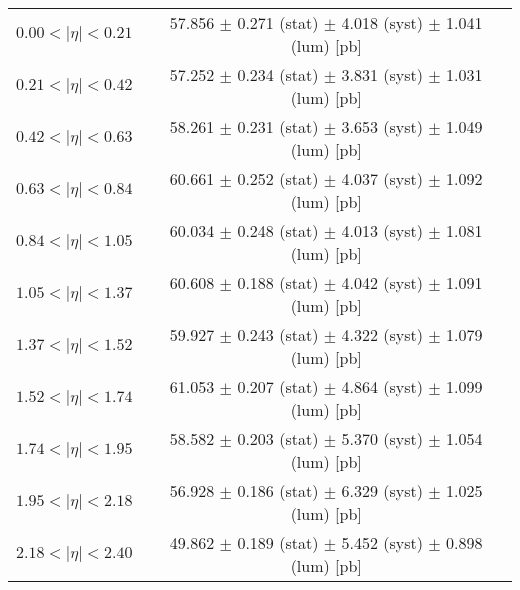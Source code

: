 \begin{tabular}{lc}
\hline
$0.00 < |\eta| <0.21$          & 57.856 $\pm$ 0.271 (stat) $\pm$ 4.018 (syst) $\pm$ 1.041 (lum) [pb]  \\
$0.21 < |\eta| <0.42$          & 57.252 $\pm$ 0.234 (stat) $\pm$ 3.831 (syst) $\pm$ 1.031 (lum) [pb]  \\
$0.42 < |\eta| <0.63$          & 58.261 $\pm$ 0.231 (stat) $\pm$ 3.653 (syst) $\pm$ 1.049 (lum) [pb]  \\
$0.63 < |\eta| <0.84$          & 60.661 $\pm$ 0.252 (stat) $\pm$ 4.037 (syst) $\pm$ 1.092 (lum) [pb]  \\
$0.84 < |\eta| <1.05$          & 60.034 $\pm$ 0.248 (stat) $\pm$ 4.013 (syst) $\pm$ 1.081 (lum) [pb]  \\
$1.05 < |\eta| <1.37$          & 60.608 $\pm$ 0.188 (stat) $\pm$ 4.042 (syst) $\pm$ 1.091 (lum) [pb]  \\
$1.37 < |\eta| <1.52$          & 59.927 $\pm$ 0.243 (stat) $\pm$ 4.322 (syst) $\pm$ 1.079 (lum) [pb]  \\
$1.52 < |\eta| <1.74$          & 61.053 $\pm$ 0.207 (stat) $\pm$ 4.864 (syst) $\pm$ 1.099 (lum) [pb]  \\
$1.74 < |\eta| <1.95$          & 58.582 $\pm$ 0.203 (stat) $\pm$ 5.370 (syst) $\pm$ 1.054 (lum) [pb]  \\
$1.95 < |\eta| <2.18$          & 56.928 $\pm$ 0.186 (stat) $\pm$ 6.329 (syst) $\pm$ 1.025 (lum) [pb]  \\
$2.18 < |\eta| <2.40$          & 49.862 $\pm$ 0.189 (stat) $\pm$ 5.452 (syst) $\pm$ 0.898 (lum) [pb]  \\
\hline
\end{tabular}
